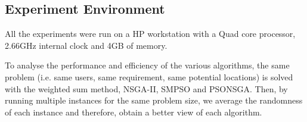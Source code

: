 \documentclass[10pt,journal,compsoc]{IEEEtran}
\begin{document}
\begin{table}[th]
\caption{Problem sizes}
\label{problemsizes}
\centering
{}
\end{table}
 

\subsection{Experiment Environment}
All the experiments were run on a HP workstation with a Quad core processor, 2.66GHz internal clock and 4GB of memory.  

To analyse the performance and efficiency of the various algorithms, the same problem (i.e. same users, same requirement, same potential locations) is solved with the weighted sum method, NSGA-II, SMPSO and PSONSGA. Then, by running multiple instances for the same problem size, we average the randomness of each instance and therefore, obtain a better view of each algorithm.
\end{document}
